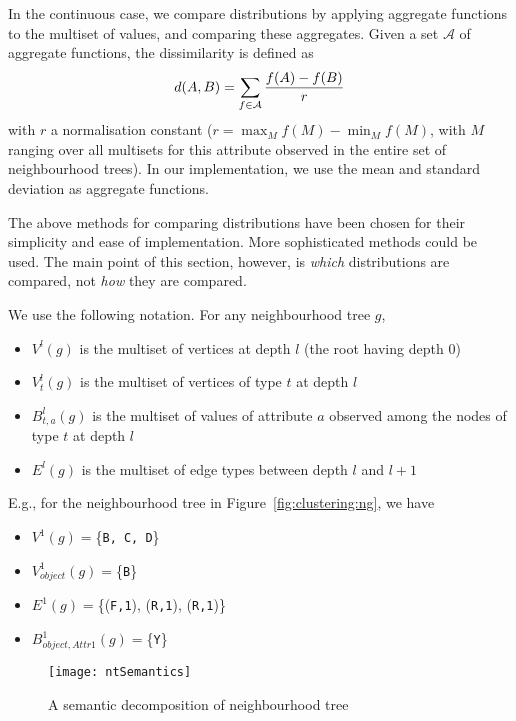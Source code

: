 In the continuous case, we compare distributions by applying aggregate functions to the multiset of values, and comparing these aggregates.  
Given a set $\mathcal{A}$ of aggregate functions, the dissimilarity is defined as
\begin{equation}
    d(A,B) = \sum_{f \in \mathcal{A}} {f(A)-f(B) \over r }
\end{equation}
with $r$ a normalisation constant ($r = \max_M f(M) - \min_M f(M)$, with $M$ ranging over all multisets for this attribute observed in the entire set of neighbourhood trees).
In our implementation, we use the mean and standard deviation as aggregate functions.


The above methods for comparing distributions have been chosen for their simplicity and ease of implementation.  More sophisticated methods could be used.  
The main point of this section, however, is {\em which} distributions are compared, not {\em how} they are compared. 


We use the following notation.  For any neighbourhood tree $g$,
\begin{itemize}
\item[\textbullet] $V^l(g)$ is the multiset of vertices at depth $l$ (the root having depth 0)
\item[\textbullet] $V^l_t(g)$ is the multiset of vertices of type $t$ at depth $l$ 
\item[\textbullet] $B^l_{t,a}(g)$ is the multiset of values of attribute $a$ observed among the nodes of type $t$ at depth $l$
\item[\textbullet] $E^l(g)$ is the multiset of edge types between depth $l$ and $l+1$
\end{itemize}

E.g., for the neighbourhood tree in Figure~\ref{fig:clustering:ng}, we have
\begin{itemize}
    \item[\textbullet] $V^1(g) = $\{{\tt B, C, D}\}
    \item[\textbullet] $V^1_{object}(g) = $\{{\tt B}\}
    \item[\textbullet] $E^1(g) = $\{({\tt F,1}), ({\tt R,1}), ({\tt R,1})\}
    \item[\textbullet] $B^1_{object,Attr1}(g) = $\{{\tt Y}\} 
\end{itemize}




\begin{figure}
	\centering
	\texttt{[image: ntSemantics]}
	\caption{A semantic decomposition of neighbourhood tree\label{fig:ntsemantics}}
\end{figure}

